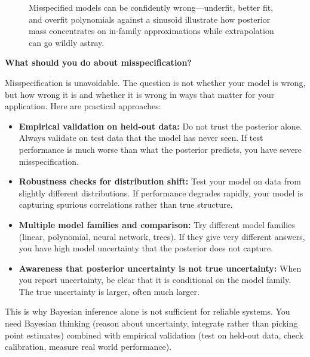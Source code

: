 \begin{figure}[t]
\centering

\caption{Misspecified models can be confidently wrong---underfit, better fit, and overfit polynomials against a sinusoid illustrate how posterior mass concentrates on in-family approximations while extrapolation can go wildly astray.}
\label{fig:misspecification}
\end{figure}

\vspace{1.5em}

\textbf{What should you do about misspecification?}

Misspecification is unavoidable. The question is not whether your model is wrong, but how wrong it is and whether it is wrong in ways that matter for your application. Here are practical approaches:

\begin{itemize}
\item \textbf{Empirical validation on held-out data:} Do not trust the posterior alone. Always validate on test data that the model has never seen. If test performance is much worse than what the posterior predicts, you have severe misspecification.

\item \textbf{Robustness checks for distribution shift:} Test your model on data from slightly different distributions. If performance degrades rapidly, your model is capturing spurious correlations rather than true structure.

\item \textbf{Multiple model families and comparison:} Try different model families (linear, polynomial, neural network, trees). If they give very different answers, you have high model uncertainty that the posterior does not capture.

\item \textbf{Awareness that posterior uncertainty is not true uncertainty:} When you report uncertainty, be clear that it is conditional on the model family. The true uncertainty is larger, often much larger.
\end{itemize}

This is why Bayesian inference alone is not sufficient for reliable systems. You need Bayesian thinking (reason about uncertainty, integrate rather than picking point estimates) combined with empirical validation (test on held-out data, check calibration, measure real world performance).

